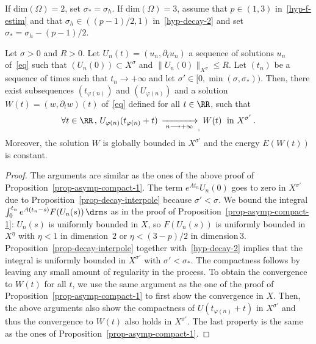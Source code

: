 \goodbreak

\begin{prop}\label{prop-asymp-compact-2}
If dim$(\Omega)=2$, set $\sigma_*=\sigma_h$. If dim$(\Omega)=3$, assume that $p\in(1,3)$ in~\eqref{hyp-f-estim} and that $\sigma_h\in ((p-1)/2,1)$ in~\eqref{hyp-decay-2} and set $\sigma_*=\sigma_h - (p-1)/2$.

Let $\sigma>0$ and $R>0$. Let $U_n(t)=(u_n,\partial_t u_n)$ a sequence of solutions $u_n$ of~\eqref{eq} such that $(U_n(0))\subset X^\sigma$ and $\|U_n(0)\|_{X^\sigma}\leq R$. Let $(t_n)$ be a sequence of times such that $t_n\rightarrow +\infty$ and let $\sigma'\in [0,\min(\sigma,\sigma_*))$. Then, there exist subsequences $(t_{\varphi(n)})$ and $(U_{\varphi(n)})$ and a solution $W(t)=(w,\partial_t w)(t)$ of~\eqref{eq} defined for all $t\in\RR$, such that
\[
\forall
t\in\RR\,,\,U_{\varphi(n)}(t_{\varphi(n)}+t)\,\xrightarrow[\;n\longrightarrow
+\infty\:]{}_,W(t)\;\text{ in } X^{\sigma'}\,.
\]
Moreover, the solution $W$ is globally bounded in $X^{\sigma'}$ and the energy $E(W(t))$ is constant.
\end{prop}
\begin{proof}
The arguments are similar as the ones of the above proof of Proposition~\ref{prop-asymp-compact-1}. The term $e^{At_n}U_n(0)$ goes to zero in $X^{\sigma'}$ due to Proposition~\ref{prop-decay-interpole} because $\sigma'<\sigma$. We bound the integral $\int_0^{t_n} e^{A(t_n-s)}F(U_n(s))\,\drm s$ as in the proof of Proposition~\ref{prop-asymp-compact-1}: $U_n(s)$ is uniformly bounded in $X$, so $F(U_n(s))$ is uniformly bounded in $X^\eta$ with $\eta<1$ in dimension~$2$ or $\eta<(3-p)/2$ in dimension\,$3$. Proposition~\ref{prop-decay-interpole} together with~\eqref{hyp-decay-2} implies that the integral is uniformly bounded in $X^{\sigma'}$ with $\sigma'<\sigma_*$. The compactness follows by leaving any small amount of regularity in the process. To obtain the convergence to $W(t)$ for all $t$, we use the same argument as the one of the proof of Proposition~\ref{prop-asymp-compact-1} to first show the convergence in $X$. Then, the above arguments also show the compactness of $U(t_{\varphi(n)}+t)$ in $X^{\sigma'}$ and thus the convergence to $W(t)$ also holds in $X^{\sigma'}$. The last property is the same as the ones of Proposition~\ref{prop-asymp-compact-1}.
\end{proof}

